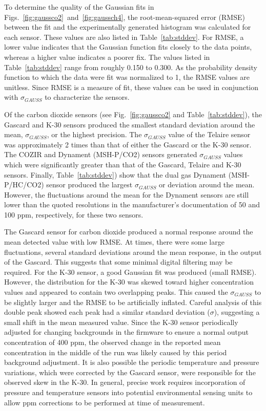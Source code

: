 \documentclass[preprint,sort&compress]{elsarticle}
\begin{document}
			To determine the quality of the Gaussian fits in Figs.~\ref{fig:gaussco2}~and~\ref{fig:gaussch4}, the root-mean-squared error (RMSE) between the fit and the experimentally generated histogram was calculated for each sensor.
			These values are also listed in Table~\ref{tab:stddev}.
			For RMSE, a lower value indicates that the Gaussian function fits closely to the data points, whereas a higher value indicates a poorer fix.
			 The values listed in Table~\ref{tab:stddev} range from roughly 0.150 to 0.300.
			As the probability density function to which the data were fit was normalized to 1, the RMSE values are unitless.
			Since RMSE is a measure of fit, these values can be used in conjunction with $\sigma_{GAUSS}$ to characterize the sensors.
			
			
			Of the carbon dioxide sensors (see Fig.~\ref{fig:gaussco2} and Table~\ref{tab:stddev}), the Gascard and K-30 sensors produced the smallest standard deviation around the mean, $\sigma_{GAUSS}$, or the highest precision.
			The $\sigma_{GAUSS}$ value of the Telaire sensor was approximately 2 times than that of either the Gascard or the K-30 sensor.
			The COZIR and Dynament (MSH-P/CO2) sensors generated $\sigma_{GAUSS}$ values which were significantly greater than that of the Gascard, Telaire and K-30 sensors.
			Finally, Table~\ref{tab:stddev}) show that the dual gas Dynament (MSH-P/HC/CO2) sensor produced the largest $\sigma_{GAUSS}$ or deviation around the mean. However, the fluctuations around the mean for the Dynament sensors are still lower than the quoted resolutions in the manufacturer's documentation of 50 and 100 ppm, respectively, for these two sensors.
			
			The Gascard sensor for carbon dioxide produced a normal response around the mean detected value with low RMSE.
			At times, there were some large fluctuations, several standard deviations around the mean response, in the output of the Gascard.
			This suggests that some minimal digital filtering may be required.
			For the K-30 sensor, a good Gaussian fit was produced (small RMSE).
			However, the distribution for the K-30 was skewed toward higher concentration values and appeared to contain two overlapping peaks. This caused the $\sigma_{GAUSS}$ to be slightly larger and the RMSE to be artificially inflated.
			Careful analysis of this double peak showed each peak had a similar standard deviation ($\sigma$), suggesting a small shift in the mean measured value.
			Since the K-30 sensor periodically adjusted for changing backgrounds in the firmware to ensure a normal output concentration of 400 ppm, the observed change in the reported mean concentration in the middle of the run was likely caused by this period background adjustment.
			It is also possible the periodic temperature and pressure variations, which were corrected by the Gascard sensor, were responsible for the observed skew in the K-30.
			In general, precise work requires incorporation of pressure and temperature sensors into potential environmental sensing units to allow ppm corrections to be performed at time of measurement.
			
\end{document}
